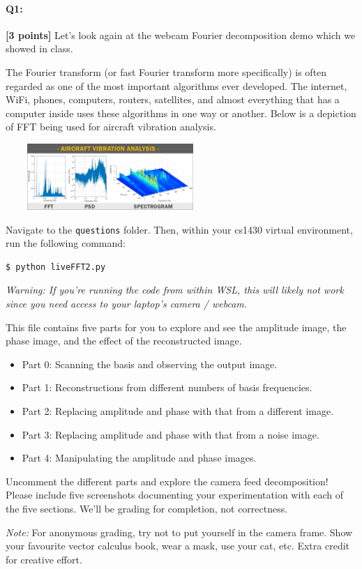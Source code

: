\documentclass[11pt]{article}
\begin{document}
\paragraph{Q1:} \textbf{[3 points]} Let's look again at the webcam Fourier decomposition demo which we showed in class. 

The Fourier transform (or fast Fourier transform more specifically) is often regarded as one of the most important algorithms ever developed. The internet, WiFi, phones, computers, routers, satellites, and almost everything that has a computer inside uses these algorithms in one way or another. Below is a depiction of FFT being used for aircraft vibration analysis.

\begin{center}
\includegraphics[width=300px,height=95px]{images/aircraft-vibration-analysis-plots.png} 
\end{center}

\begin{tcolorbox}[colback=orange!5!white,colframe=orange!75!black]
Navigate to the \texttt{questions} folder. Then, within your cs1430 virtual environment, run the following command:
\begin{verbatim}
$ python liveFFT2.py
\end{verbatim}

\textit{Warning: If you're running the code from within WSL, this will likely not work since you need access to your laptop's camera / webcam.}

This file contains five parts for you to explore and see the amplitude image, the phase image, and the effect of the reconstructed image.
\begin{itemize}
    \item Part 0: Scanning the basis and observing the output image.
    \item Part 1: Reconstructions from different numbers of basis frequencies.
    \item Part 2: Replacing amplitude and phase with that from a different image.
    \item Part 3: Replacing amplitude and phase with that from a noise image.
    \item Part 4: Manipulating the amplitude and phase images.
\end{itemize}

Uncomment the different parts and explore the camera feed decomposition! Please include five screenshots documenting your experimentation with each of the five sections. We'll be grading for completion, not correctness.

\emph{Note:} For anonymous grading, try not to put yourself in the camera frame. Show your favourite vector calculus book, wear a mask, use your cat, etc. Extra credit for creative effort.
\end{tcolorbox}
\end{document}
